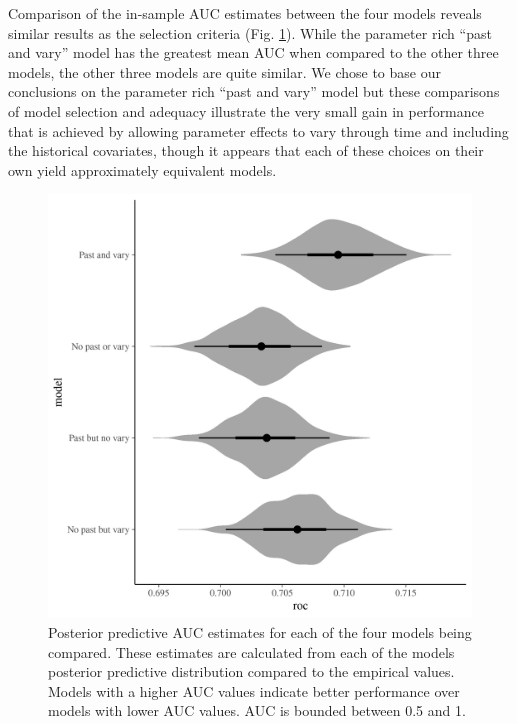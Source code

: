 \documentclass[12pt,letterpaper]{article}
\begin{document}
Comparison of the in-sample AUC estimates between the four models reveals similar results as the selection criteria (Fig. \ref{fig:roc_hist}). While the parameter rich ``past and vary'' model has the greatest mean AUC when compared to the other three models, the other three models are quite similar. We chose to base our conclusions on the parameter rich ``past and vary'' model but these comparisons of model selection and adequacy illustrate the very small gain in performance that is achieved by allowing parameter effects to vary through time and including the historical covariates, though it appears that each of these choices on their own yield approximately equivalent models.
\begin{figure}[ht]
  \centering
  \includegraphics[width=\textwidth,height=0.5\textheight,keepaspectratio=true]{figure/roc_hist}
  \caption{Posterior predictive AUC estimates for each of the four models being compared. These estimates are calculated from each of the models posterior predictive distribution compared to the empirical values. Models with a higher AUC values indicate better performance over models with lower AUC values. AUC is bounded between 0.5 and 1.}
  \label{fig:roc_hist}
\end{figure}
\end{document}
